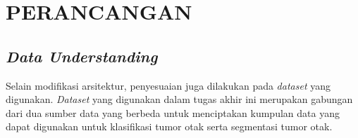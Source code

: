 \cleardoublepage
\chapter{PERANCANGAN}
\label{chap:perancangan}

\section{\textit{Data Understanding}}
Selain modifikasi arsitektur, penyesuaian juga dilakukan pada \textit{dataset} yang digunakan. \textit{Dataset} yang digunakan dalam tugas akhir ini merupakan gabungan dari dua sumber data yang berbeda untuk menciptakan kumpulan data yang dapat digunakan untuk klasifikasi tumor otak serta segmentasi tumor otak.

